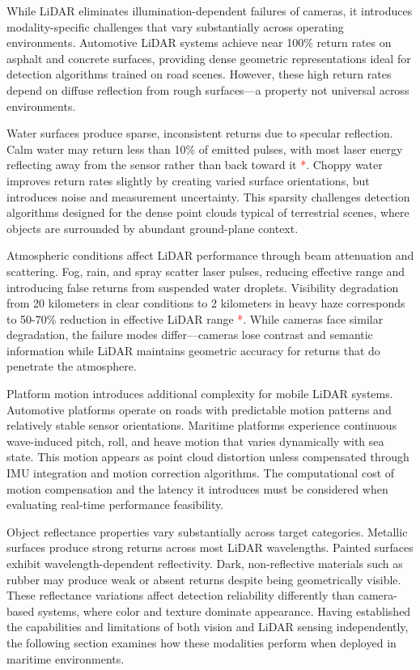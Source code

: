 \documentclass[../main.tex]{subfiles}
\begin{document}
While LiDAR eliminates illumination-dependent failures of cameras, it introduces modality-specific challenges that vary substantially across operating environments. Automotive LiDAR systems achieve near 100\% return rates on asphalt and concrete surfaces, providing dense geometric representations ideal for detection algorithms trained on road scenes. However, these high return rates depend on diffuse reflection from rough surfaces—a property not universal across environments.

Water surfaces produce sparse, inconsistent returns due to specular reflection. Calm water may return less than 10\% of emitted pulses, with most laser energy reflecting away from the sensor rather than back toward it \textcolor{red}{*}. Choppy water improves return rates slightly by creating varied surface orientations, but introduces noise and measurement uncertainty. This sparsity challenges detection algorithms designed for the dense point clouds typical of terrestrial scenes, where objects are surrounded by abundant ground-plane context.

Atmospheric conditions affect LiDAR performance through beam attenuation and scattering. Fog, rain, and spray scatter laser pulses, reducing effective range and introducing false returns from suspended water droplets. Visibility degradation from 20 kilometers in clear conditions to 2 kilometers in heavy haze corresponds to 50-70\% reduction in effective LiDAR range \textcolor{red}{*}. While cameras face similar degradation, the failure modes differ—cameras lose contrast and semantic information while LiDAR maintains geometric accuracy for returns that do penetrate the atmosphere.

Platform motion introduces additional complexity for mobile LiDAR systems. Automotive platforms operate on roads with predictable motion patterns and relatively stable sensor orientations. Maritime platforms experience continuous wave-induced pitch, roll, and heave motion that varies dynamically with sea state. This motion appears as point cloud distortion unless compensated through IMU integration and motion correction algorithms. The computational cost of motion compensation and the latency it introduces must be considered when evaluating real-time performance feasibility.

Object reflectance properties vary substantially across target categories. Metallic surfaces produce strong returns across most LiDAR wavelengths. Painted surfaces exhibit wavelength-dependent reflectivity. Dark, non-reflective materials such as rubber may produce weak or absent returns despite being geometrically visible. These reflectance variations affect detection reliability differently than camera-based systems, where color and texture dominate appearance. Having established the capabilities and limitations of both vision and LiDAR sensing independently, the following section examines how these modalities perform when deployed in maritime environments.
\end{document}
